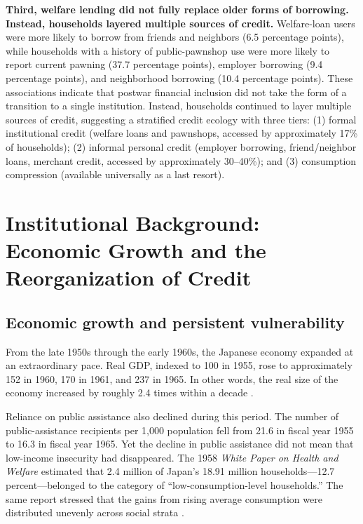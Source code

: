 \documentclass[12pt]{article}
\begin{document}
\textbf{Third, welfare lending did not fully replace older forms of borrowing. Instead, households layered multiple sources of credit.} Welfare-loan users were more likely to borrow from friends and neighbors (6.5 percentage points), while households with a history of public-pawnshop use were more likely to report current pawning (37.7 percentage points), employer borrowing (9.4 percentage points), and neighborhood borrowing (10.4 percentage points). These associations indicate that postwar financial inclusion did not take the form of a transition to a single institution. Instead, households continued to layer multiple sources of credit, suggesting a stratified credit ecology with three tiers: (1) formal institutional credit (welfare loans and pawnshops, accessed by approximately 17\% of households); (2) informal personal credit (employer borrowing, friend/neighbor loans, merchant credit, accessed by approximately 30--40\%); and (3) consumption compression (available universally as a last resort).

\newpage
\section{Institutional Background: Economic Growth and the Reorganization of Credit}

\subsection{Economic growth and persistent vulnerability}

From the late 1950s through the early 1960s, the Japanese economy expanded at an extraordinary pace. Real GDP, indexed to 100 in 1955, rose to approximately 152 in 1960, 170 in 1961, and 237 in 1965. In other words, the real size of the economy increased by roughly 2.4 times within a decade \citep{CabinetOffice2000}.

Reliance on public assistance also declined during this period. The number of public-assistance recipients per 1,000 population fell from 21.6 in fiscal year 1955 to 16.3 in fiscal year 1965. Yet the decline in public assistance did not mean that low-income insecurity had disappeared. The 1958 \textit{White Paper on Health and Welfare} estimated that 2.4 million of Japan's 18.91 million households---12.7 percent---belonged to the category of ``low-consumption-level households.'' The same report stressed that the gains from rising average consumption were distributed unevenly across social strata \citep{MinistryOfHealth1958}.
\end{document}
